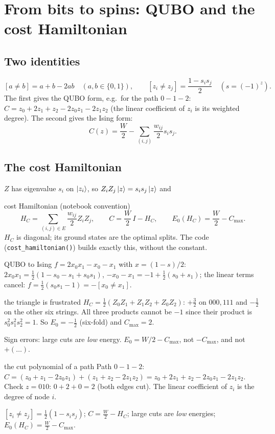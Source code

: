 \documentclass[11pt,a4paper,openany]{book}
\newcounter{wex}[chapter]
\begin{document}
\section{From bits to spins: QUBO and the cost Hamiltonian}
\subsection{Two identities}
\[ [a \neq b] = a + b - 2ab \quad(a, b \in \{0,1\}), \qquad [z_i\neq z_j] = \frac{1 - s_is_j}{2} \quad(s = (-1)^z). \]
The first gives the QUBO form, e.g.\ for the path $0{-}1{-}2$: $C = z_0 + 2z_1 + z_2 - 2z_0z_1 - 2z_1z_2$ (the linear coefficient of
$z_i$ is its weighted degree). The second gives the Ising form:
\[ C(z) = \frac W2 - \sum_{(i,j)}\frac{w_{ij}}{2}s_is_j . \]
\subsection{The cost Hamiltonian}
$Z$ has eigenvalue $s_i$ on $\ket{z_i}$, so $Z_iZ_j\ket z = s_is_j\ket z$ and
\begin{keyres}{cost Hamiltonian (notebook convention)}
\[ H_C = \sum_{(i,j)\in E}\frac{w_{ij}}{2}Z_iZ_j, \qquad C = \frac W2\,I - H_C, \qquad E_0(H_C) = \frac W2 - C_{\max}. \]
$H_C$ is diagonal; its ground states are the optimal splits. The code (\texttt{cost\_hamiltonian()}) builds exactly this, without
the constant.
\end{keyres}
\begin{wexample}{QUBO to Ising}
$f = 2x_0x_1 - x_0 - x_1$ with $x = (1 - s)/2$: $2x_0x_1 = \frac12(1 - s_0 - s_1 + s_0s_1)$, $-x_0 - x_1 = -1 + \frac12(s_0 + s_1)$; the
linear terms cancel: $f = \frac12(s_0s_1 - 1) = -[x_0\neq x_1]$.
\end{wexample}
\begin{wexample}{the triangle is frustrated}
$H_C = \frac12(Z_0Z_1 + Z_1Z_2 + Z_0Z_2)$: $+\frac32$ on $000, 111$ and $-\frac12$ on the other six strings. All three products cannot be
$-1$ since their product is $s_0^2s_1^2s_2^2 = 1$. So $E_0 = -\frac12$ (six-fold) and $C_{\max} = 2$.
\end{wexample}
\begin{trap}
Sign errors: large cuts are \emph{low} energy. $E_0 = W/2 - C_{\max}$, not $-C_{\max}$, and not $+(\dots)$.
\end{trap}

\begin{wexample}{the cut polynomial of a path}
Path $0{-}1{-}2$: $C = (z_0 + z_1 - 2z_0z_1) + (z_1 + z_2 - 2z_1z_2) = z_0 + 2z_1 + z_2 - 2z_0z_1 - 2z_1z_2$. Check $z = 010$: $0 + 2 + 0 = 2$ (both edges cut).
The linear coefficient of $z_i$ is the degree of node $i$.
\end{wexample}
\begin{checklist}
$[z_i\neq z_j] = \frac12(1 - s_is_j)$; $C = \frac W2 - H_C$; large cuts are \emph{low} energies; $E_0(H_C) = \frac W2 - C_{\max}$.
\end{checklist}
\end{document}
